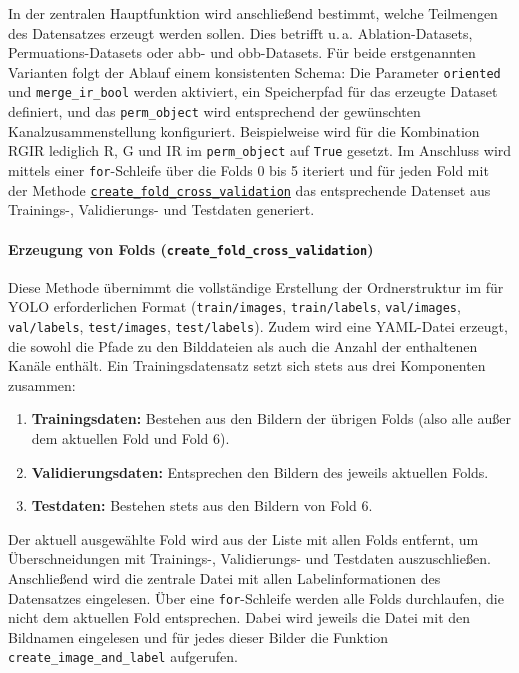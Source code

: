 In der zentralen Hauptfunktion wird anschließend bestimmt, welche Teilmengen des Datensatzes erzeugt werden sollen. Dies betrifft u.\,a. Ablation-Datasets, Permuations-Datasets oder \acrshort{abb}- und \acrshort{obb}-Datasets. Für beide erstgenannten Varianten folgt der Ablauf einem konsistenten Schema: Die Parameter \lstinline|oriented| und \lstinline|merge_ir_bool| werden aktiviert, ein Speicherpfad für das erzeugte Dataset definiert, und das \lstinline|perm_object| wird entsprechend der gewünschten Kanalzusammenstellung konfiguriert. Beispielweise wird für die Kombination \acrshort{RGIR} lediglich \acrshort{R}, \acrshort{G} und \acrshort{IR} im \lstinline|perm_object| auf \lstinline|True| gesetzt. Im Anschluss wird mittels einer \texttt{for}-Schleife über die Folds 0 bis 5 iteriert und für jeden Fold mit der Methode \hyperlink{par:create_fold_cv}{\lstinline|create_fold_cross_validation|} das entsprechende Datenset aus Trainings-, Validierungs- und Testdaten generiert.

\paragraph{Erzeugung von Folds (\lstinline|create_fold_cross_validation|)}
\hypertarget{par:create_fold_cv}{}

Diese Methode übernimmt die vollständige Erstellung der Ordnerstruktur im für \acrshort{YOLO} erforderlichen Format (\texttt{train/images}, \texttt{train/labels}, \texttt{val/images}, \texttt{val/labels}, \texttt{test/images}, \texttt{test/labels}). Zudem wird eine \acrshort{YAML}-Datei erzeugt, die sowohl die Pfade zu den Bilddateien als auch die Anzahl der enthaltenen Kanäle enthält. Ein Trainingsdatensatz setzt sich stets aus drei Komponenten zusammen: 
\begin{enumerate}
    \item \textbf{Trainingsdaten:} Bestehen aus den Bildern der übrigen Folds (also alle außer dem aktuellen Fold und Fold 6).
    \item \textbf{Validierungsdaten:} Entsprechen den Bildern des jeweils aktuellen Folds.
    \item \textbf{Testdaten:} Bestehen stets aus den Bildern von Fold 6.
\end{enumerate}

Der aktuell ausgewählte Fold wird aus der Liste mit allen Folds entfernt, um Überschneidungen mit Trainings-, Validierungs- und Testdaten auszuschließen. Anschließend wird die zentrale Datei mit allen Labelinformationen des Datensatzes eingelesen. Über eine \texttt{for}-Schleife werden alle Folds durchlaufen, die nicht dem aktuellen Fold entsprechen. Dabei wird jeweils die Datei mit den Bildnamen eingelesen und für jedes dieser Bilder die Funktion \lstinline|create_image_and_label| aufgerufen.

